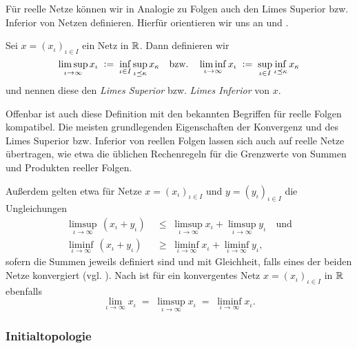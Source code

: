 \documentclass[../main/main.tex]{subfiles}
\begin{document}
	Für reelle Netze können wir in Analogie zu Folgen auch den Limes Superior bzw. Inferior von Netzen definieren. Hierfür orientieren wir uns an
	\cite[Kapitel 2.1 und Aufgabe 2.55]{Megginson.1998} und \cite[Kapitel 2.4]{Aliprantis.2006}.
	
	\begin{Definition}
		Sei $x = (x_\iota)_{\iota \in I}$ ein Netz in $\mathbb{R}$. Dann definieren wir 
		\[ \limsup_{\iota \to \infty} x_\iota \; \vcentcolon = \; \inf_{\iota \in I} \sup_{\iota \preceq \kappa} x_\kappa \quad \text{bzw.} \quad 
		\liminf_{\iota \to \infty} x_\iota \; \vcentcolon = \; \sup_{\iota \in I} \inf_{\iota \preceq \kappa} x_\kappa \]
		und nennen diese den \emph{Limes Superior} bzw. \emph{Limes Inferior} von $x$.
	\end{Definition}
	
	\begin{Bemerkung}
		Offenbar ist auch diese Definition mit den bekannten Begriffen für reelle Folgen kompatibel. Die meisten grundlegenden Eigenschaften der Konvergenz und des 
		Limes Superior bzw. Inferior von reellen Folgen lassen sich auch auf reelle Netze übertragen, 
		wie etwa die üblichen Rechenregeln für die Grenzwerte von Summen und Produkten reeller Folgen.
		
		Außerdem gelten etwa für Netze $x = (x_\iota)_{\iota \in I}$ und
		$y = (y_\iota)_{\iota \in I}$ die Ungleichungen
		\begin{align*}
			\limsup_{\iota \to \infty} \, (x_\iota + y_\iota) \; &\leq \; \limsup_{\iota \to \infty} x_\iota + \limsup_{\iota \to \infty} y_\iota \quad \text{und}\\
			\liminf_{\iota \to \infty} \, (x_\iota + y_\iota) \; &\geq \; \liminf_{\iota \to \infty} x_\iota + \liminf_{\iota \to \infty} y_\iota \text{,}
		\end{align*}
		sofern die Summen jeweils definiert sind und
		mit Gleichheit, falls eines der beiden Netze konvergiert (vgl. \cite[Aufgabe 2.55 (e)]{Megginson.1998}).
		Nach \cite[Aufgabe 2.55 (i)]{Megginson.1998} ist für ein konvergentes Netz $x = (x_\iota)_{\iota \in I}$ in $\mathbb{R}$ ebenfalls
		\[ \lim_{\iota \to \infty} x_\iota \; = \; \limsup_{\iota \to \infty} x_\iota \; = \; \liminf_{\iota \to \infty} x_\iota \text{.} \]
	\end{Bemerkung}
	
	\subsubsection*{Initialtopologie}
	
\end{document}
